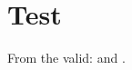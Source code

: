 \documentclass[a4paper,10pt]{article}
\begin{document}
\section{Test}

From the valid: \cite{most09complete} and
\cite{just08anid,one07author,minimal07working,utf8test}.






 
\end{document}
